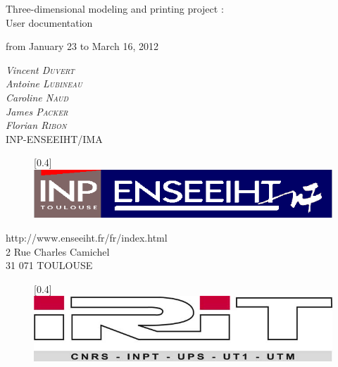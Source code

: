 \documentclass{article}
\begin{document}
\bigskip
\bigskip
\bigskip
\bigskip
\bigskip
\bigskip
\bigskip
\bigskip

\begin{center}
\LARGE{Three-dimensional modeling and printing project :\\User documentation \\}
\bigskip
\bigskip\begin{tiny}
\end{tiny}
\Large{from January 23 to March 16, 2012}
\end{center}

\bigskip
\bigskip

\begin{center}
\large{
\textit{Vincent \textsc{Duvert} \\
Antoine \textsc{Lubineau} \\
Caroline \textsc{Naud} \\
James \textsc{Packer} \\
Florian \textsc{Ribon}} \\
\bigskip
INP-ENSEEIHT/IMA 
}
\end{center}

\begin{figure}[!h]
\begin{center}
\scalebox{0.4}[0.4]{\includegraphics{./Images/enseeiht}}
\end{center}
\end{figure}

\bigskip

\begin{center}
http://www.enseeiht.fr/fr/index.html \\
2 Rue Charles Camichel \\
31 071 TOULOUSE
\end{center}

\bigskip

\begin{figure}[!h]
\begin{center}
\scalebox{0.4}[0.4]{\includegraphics{./Images/irit}}
\end{center}
\end{figure}
\end{document}
